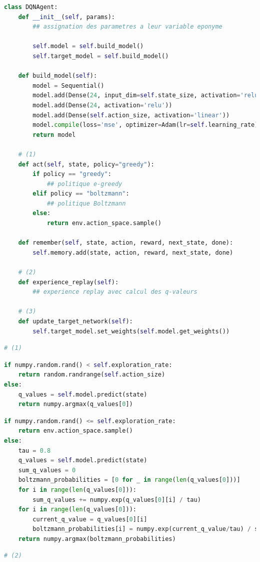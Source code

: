 \documentclass[10pt,a4paper]{article}
\begin{document}
\begin{lstlisting}[language=Python, caption=Programme principal de l'agent utilisant l'expérience replay]
class DQNAgent:
    def __init__(self, params):
        ## assignation des parametres a leur variable eponyme

        self.model = self.build_model()
        self.target_model = self.build_model()

    def build_model(self):
        model = Sequential()
        model.add(Dense(24, input_dim=self.state_size, activation='relu'))
        model.add(Dense(24, activation='relu'))
        model.add(Dense(self.action_size, activation='linear'))
        model.compile(loss='mse', optimizer=Adam(lr=self.learning_rate))
        return model

	# (1)
    def act(self, state, policy="greedy"):
        if policy == "greedy":
            ## politique e-greedy
        elif policy == "boltzmann":
            ## politique Boltzmann
        else:
            return env.action_space.sample()

    def remember(self, state, action, reward, next_state, done):
        self.memory.add(state, action, reward, next_state, done)

	# (2)
    def experience_replay(self):
        ## experience replay avec calcul des q-valeurs
    
    # (3)
    def update_target_network(self):
        self.target_model.set_weights(self.model.get_weights())
\end{lstlisting}

\begin{lstlisting}[language=Python]
# (1)
\end{lstlisting}
\begin{lstlisting}[language=Python, caption=Politique e-greedy]
if numpy.random.rand() < self.exploration_rate:
    return random.randrange(self.action_size)
else:
    q_values = self.model.predict(state)
    return numpy.argmax(q_values[0])
\end{lstlisting}    

\begin{lstlisting}[language=Python,caption=politique de Boltzmann]          
if numpy.random.rand() <= self.exploration_rate:
    return env.action_space.sample()
else:
    tau = 0.8
    q_values = self.model.predict(state)
    sum_q_values = 0
    boltzmann_probabilities = [0 for _ in range(len(q_values[0]))]
    for i in range(len(q_values[0])):
        sum_q_values += numpy.exp(q_values[0][i] / tau)
    for i in range(len(q_values[0])):
        current_q_value = q_values[0][i]
        boltzmann_probabilities[i] = numpy.exp(current_q_value/tau) / sum_q_values
    return numpy.argmax(boltzmann_probabilities)
\end{lstlisting}
\begin{lstlisting}[language=Python]
# (2)
\end{lstlisting}
\end{document}
